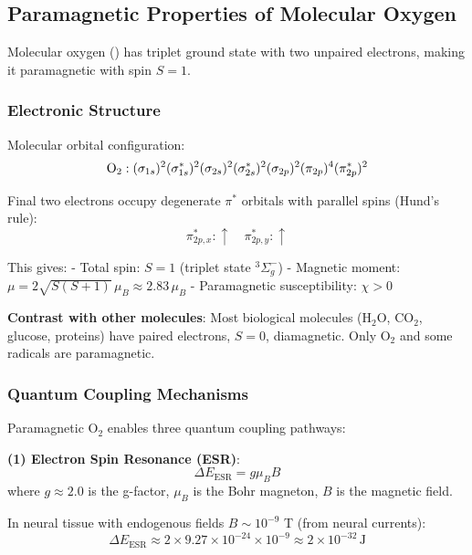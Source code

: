 \documentclass[11pt,onecolumn]{article}
\begin{document}
\subsection{Paramagnetic Properties of Molecular Oxygen}

\begin{theorem}[O$_2$ Paramagnetism]
Molecular oxygen () has triplet ground state with two unpaired electrons, making it paramagnetic with spin $S=1$.
\end{theorem}

\subsubsection{Electronic Structure}

Molecular orbital configuration:
\begin{equation}
\ce{O2}: (\sigma_{1s})^2 (\sigma_{1s}^*)^2 (\sigma_{2s})^2 (\sigma_{2s}^*)^2 (\sigma_{2p})^2 (\pi_{2p})^4 (\pi_{2p}^*)^2
\end{equation}

Final two electrons occupy degenerate $\pi^*$ orbitals with parallel spins (Hund's rule):
\begin{equation}
\pi_{2p,x}^*: \uparrow \quad \pi_{2p,y}^*: \uparrow
\end{equation}

This gives:
- Total spin: $S = 1$ (triplet state $^3\Sigma_g^-$)
- Magnetic moment: $\mu = 2\sqrt{S(S+1)}\,\mu_B \approx 2.83\,\mu_B$
- Paramagnetic susceptibility: $\chi > 0$

\textbf{Contrast with other molecules}: Most biological molecules (H$_2$O, CO$_2$, glucose, proteins) have paired electrons, $S=0$, diamagnetic. Only O$_2$ and some radicals are paramagnetic.

\subsubsection{Quantum Coupling Mechanisms}

Paramagnetic O$_2$ enables three quantum coupling pathways:

\textbf{(1) Electron Spin Resonance (ESR)}:
\begin{equation}
\Delta E_{\text{ESR}} = g \mu_B B
\end{equation}
where $g \approx 2.0$ is the g-factor, $\mu_B$ is the Bohr magneton, $B$ is the magnetic field.

In neural tissue with endogenous fields $B \sim 10^{-9}$ T (from neural currents):
\begin{equation}
\Delta E_{\text{ESR}} \approx 2 \times 9.27 \times 10^{-24} \times 10^{-9} \approx 2 \times 10^{-32}\,\text{J}
\end{equation}
\end{document}

